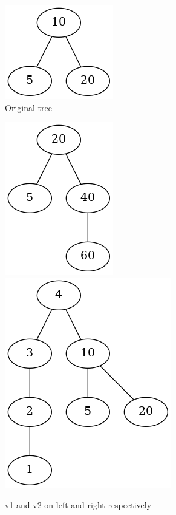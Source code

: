 \documentclass{article}
\begin{document}
\begin{figure}[H]
  \begin{subfigure}{\linewidth}
  \begin{center}
  \includegraphics[height=.2\textheight,keepaspectratio]{set-avl-original.png}
  \end{center}
  \caption{Original tree}
  \end{subfigure}\par\medskip
  \begin{subfigure}{\linewidth}
  \includegraphics[width=.3\linewidth, height=.3\textheight,keepaspectratio]{set-avl-v1.png}\hfill
  \includegraphics[width=.4\linewidth,height=.4\textheight,keepaspectratio]{set-avl-v2.png}
  \caption{v1 and v2 on left and right respectively}
  \end{subfigure}\par\medskip
  \begin{subfigure}{\linewidth}
  \begin{center}

\end{center}
\end{subfigure}
\end{figure}
\end{document}
